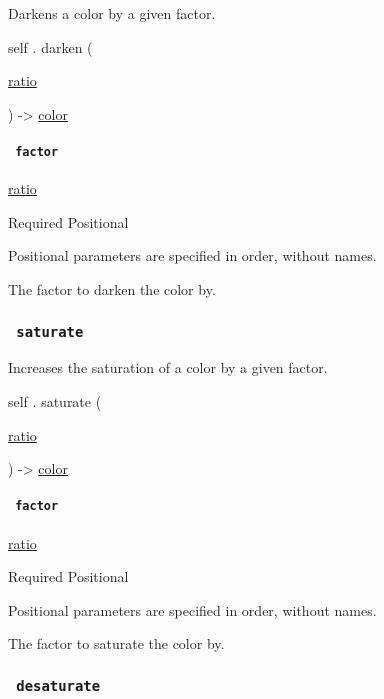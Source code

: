 Darkens a color by a given factor.

self { . } { darken } (

{ \href{/docs/reference/layout/ratio/}{ratio} }

) -\textgreater{} \href{/docs/reference/visualize/color/}{color}

\paragraph{\texorpdfstring{\texttt{\ factor\ }}{ factor }}\label{definitions-darken-factor}

\href{/docs/reference/layout/ratio/}{ratio}

{Required} {{ Positional }}

\label{definitions-darken-factor-positional-tooltip}
Positional parameters are specified in order, without names.

The factor to darken the color by.

\subsubsection{\texorpdfstring{\texttt{\ saturate\ }}{ saturate }}\label{definitions-saturate}

Increases the saturation of a color by a given factor.

self { . } { saturate } (

{ \href{/docs/reference/layout/ratio/}{ratio} }

) -\textgreater{} \href{/docs/reference/visualize/color/}{color}

\paragraph{\texorpdfstring{\texttt{\ factor\ }}{ factor }}\label{definitions-saturate-factor}

\href{/docs/reference/layout/ratio/}{ratio}

{Required} {{ Positional }}

\label{definitions-saturate-factor-positional-tooltip}
Positional parameters are specified in order, without names.

The factor to saturate the color by.

\subsubsection{\texorpdfstring{\texttt{\ desaturate\ }}{ desaturate }}\label{definitions-desaturate}

